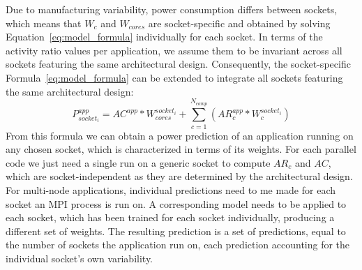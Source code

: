 Due to manufacturing variability, power consumption differs between sockets, which means that  $W_c$ and $W_{cores}$ are socket-specific and obtained by
solving Equation~\ref{eq:model_formula} individually for each socket.
In terms of the activity ratio values per application, we assume them to be invariant across all sockets featuring the same architectural design.
Consequently, the socket-specific Formula~\ref{eq:model_formula} can be extended to integrate all sockets featuring the same architectural design: 
\begin{equation}
\label{eq:model_variability_formula}
P_{socket_i}^{app} = AC^{app} * W_{cores}^{socket_i} + \sum_{c=1}^{N_{comp}} ( AR_c^{app} * W_c^{socket_i} )
\end{equation}
From this formula we can obtain a power prediction of an application running on any chosen socket, which is characterized in terms of its weights.
For each parallel code we just need a single run on a generic socket to compute $AR_c$ and $AC$, which are socket-independent as they are determined by the architectural design.
For multi-node applications, individual predictions need to me made for each socket an MPI process is run on.  A corresponding model needs to be applied to each socket, 
which has been trained for each socket individually, producing a different set of weights.  
The resulting prediction is a set of predictions, equal to the number of sockets the application run on, each prediction accounting for the individual socket's own variability. 


